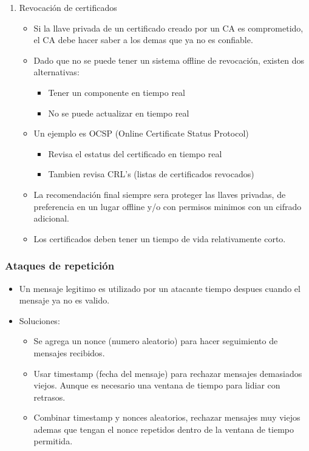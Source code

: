 \documentclass[11pt]{article}
\begin{document}
\begin{enumerate}
\item Revocación de certificados
\label{sec:orgf114efb}
\begin{itemize}
\item Si la llave privada de un certificado creado por un CA es comprometido, el CA debe hacer saber a los demas que ya no es confiable.

\item Dado que no se puede tener un sistema offline de revocación, existen dos alternativas:
\begin{itemize}
\item Tener un componente en tiempo real
\item No se puede actualizar en tiempo real
\end{itemize}

\item Un ejemplo es OCSP (Online Certificate Status Protocol)
\begin{itemize}
\item Revisa el estatus del certificado en tiempo real
\item Tambien revisa CRL's (listas de certificados revocados)
\end{itemize}

\item La recomendación final siempre sera proteger las llaves privadas, de preferencia en un lugar offline y/o con permisos minimos con un cifrado adicional.
\item Los certificados deben tener un tiempo de vida relativamente corto.
\end{itemize}
\end{enumerate}
\subsubsection{Ataques de repetición}
\label{sec:orgae1dc67}
\begin{itemize}
\item Un mensaje legitimo es utilizado por un atacante tiempo despues cuando el mensaje ya no es valido.

\item Soluciones:
\begin{itemize}
\item Se agrega un nonce (numero aleatorio) para hacer seguimiento de mensajes recibidos.
\item Usar timestamp (fecha del mensaje) para rechazar mensajes demasiados viejos. Aunque es necesario una ventana de tiempo para lidiar con retrasos.
\item Combinar timestamp y nonces aleatorios, rechazar mensajes muy viejos ademas que tengan el nonce repetidos dentro de la ventana de tiempo permitida.
\end{itemize}
\end{itemize}
\end{document}
